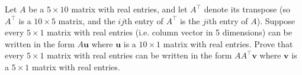 Let $A$ be a $5 \times 10$ matrix with real entries, and let $A^\top$ denote
its transpose (so $A^\top$ is a $10 \times 5$ matrix, and the $ij$th entry of
$A^\top$ is the $ji$th entry of $A$). Suppose every $5 \times 1$ matrix with
real entries (i.e. column vector in 5 dimensions) can be written in the form
$A\textbf{u}$ where $\textbf{u}$ is a $10 \times 1$ matrix with real entries.
Prove that every $5 \times 1$ matrix with real entries can be written in the
form $AA^\top \textbf{v}$ where $\textbf{v}$ is a $5 \times 1$ matrix with real
entries.

